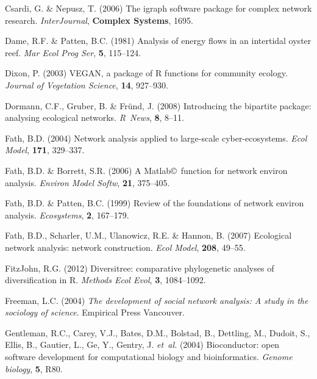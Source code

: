 \documentclass[11pt]{article}
\newcommand{\R}{R}
\begin{document}
\begin{thebibliography}{79}
Csardi, G. \& Nepusz, T. (2006) The igraph software package for complex network
  research.
\newblock \emph{InterJournal}, \textbf{Complex Systems}, 1695.

Dame, R.F. \& Patten, B.C. (1981) Analysis of energy flows in an intertidal
  oyster reef.
\newblock \emph{Mar Ecol Prog Ser}, \textbf{5}, 115--124.

Dixon, P. (2003) {VEGAN}, a package of {R} functions for community ecology.
\newblock \emph{Journal of Vegetation Science}, \textbf{14}, 927--930.

Dormann, C.F., Gruber, B. \& Fr{\"u}nd, J. (2008) Introducing the bipartite
  package: analysing ecological networks.
\newblock \emph{\R\ News}, \textbf{8}, 8--11.

Fath, B.D. (2004) Network analysis applied to large-scale cyber-ecosystems.
\newblock \emph{Ecol Model}, \textbf{171}, 329--337.

Fath, B.D. \& Borrett, S.R. (2006) A {Matlab}\copyright\ function for network
  environ analysis.
\newblock \emph{Environ Model Softw}, \textbf{21}, 375--405.

Fath, B.D. \& Patten, B.C. (1999) Review of the foundations of network environ
  analysis.
\newblock \emph{Ecosystems}, \textbf{2}, 167--179.

Fath, B.D., Scharler, U.M., Ulanowicz, R.E. \& Hannon, B. (2007) Ecological
  network analysis: network construction.
\newblock \emph{Ecol Model}, \textbf{208}, 49--55.

FitzJohn, R.G. (2012) Diversitree: comparative phylogenetic analyses of
  diversification in {R}.
\newblock \emph{Methods Ecol Evol}, \textbf{3}, 1084--1092.

Freeman, L.C. (2004) \emph{The development of social network analysis: A study
  in the sociology of science}.
\newblock Empirical Press Vancouver.

Gentleman, R.C., Carey, V.J., Bates, D.M., Bolstad, B., Dettling, M., Dudoit,
  S., Ellis, B., Gautier, L., Ge, Y., Gentry, J. \emph{et~al.} (2004)
  Bioconductor: open software development for computational biology and
  bioinformatics.
\newblock \emph{Genome biology}, \textbf{5}, R80.


\end{thebibliography}
\end{document}
